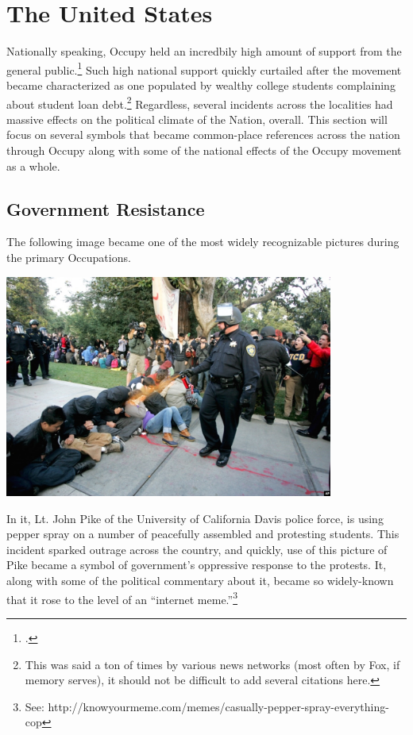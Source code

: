 \documentclass{article}
\begin{document}
\section{The United States}
Nationally speaking, Occupy held an incredbily high amount of support from the general public.\footcite{cooper11}
Such high national support quickly curtailed after the movement became characterized as one populated by wealthy college students complaining about student loan debt.\footnote{This was said a ton of times by various news networks (most often by Fox, if memory serves), it should not be difficult to add several citations here.}
Regardless, several incidents across the localities had massive effects on the political climate of the Nation, overall.
This section will focus on several symbols that became common-place references across the nation through Occupy along with some of the national effects of the Occupy movement as a whole.

\subsection{Government Resistance}
The following image became one of the most widely recognizable pictures during the primary Occupations.

\includegraphics[width=4.25in]{graphics/pike.jpg}

In it, Lt. John Pike of the University of California Davis police force, is using pepper spray on a number of peacefully assembled and protesting students.
This incident sparked outrage across the country, and quickly, use of this picture of Pike became a symbol of government's oppressive response to the protests.
It, along with some of the political commentary about it, became so widely-known that it rose to the level of an ``internet meme.''\footnote{See: http://knowyourmeme.com/memes/casually-pepper-spray-everything-cop}
\end{document}
